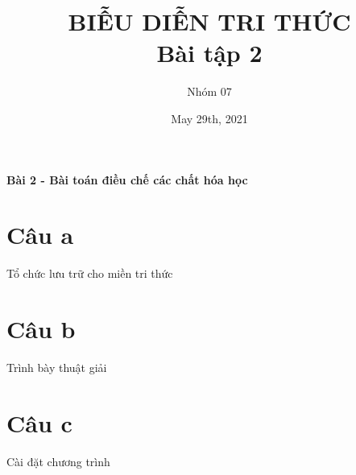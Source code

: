 \documentclass{article}
\title{BIỄU DIỄN TRI THỨC\\ Bài tập 2}
\author{Nhóm 07}
\date{May 29th, 2021}
\begin{document}
	\maketitle
	\begin{center}
		\Large{\textbf{Bài 2 - Bài toán điều chế các chất hóa học}}
	\end{center}
	\section*{Câu a}
	Tổ chức lưu trữ cho miền tri thức
	
	\section*{Câu b}
	Trình bày thuật giải
	
	\section*{Câu c}
	Cài đặt chương trình
\end{document}
